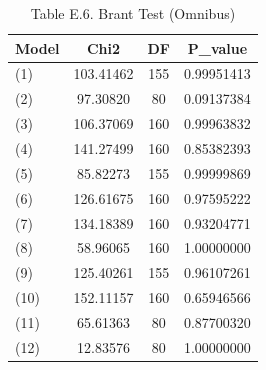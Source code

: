 \begin{table}[!htbp]
\centering
\caption{Table E.6. Brant Test (Omnibus)}
\begin{tabular}{lccc}
\hline
Model & Chi2 & DF & P\_value \\
\hline
(1) & 103.41462 & 155 & 0.99951413 \\
(2) &  97.30820 &  80 & 0.09137384 \\
(3) & 106.37069 & 160 & 0.99963832 \\
(4) & 141.27499 & 160 & 0.85382393 \\
(5) &  85.82273 & 155 & 0.99999869 \\
(6) & 126.61675 & 160 & 0.97595222 \\
(7) & 134.18389 & 160 & 0.93204771 \\
(8) &  58.96065 & 160 & 1.00000000 \\
(9) & 125.40261 & 155 & 0.96107261 \\
(10) & 152.11157 & 160 & 0.65946566 \\
(11) &  65.61363 &  80 & 0.87700320 \\
(12) &  12.83576 &  80 & 1.00000000 \\
\hline
\end{tabular}
\end{table}
